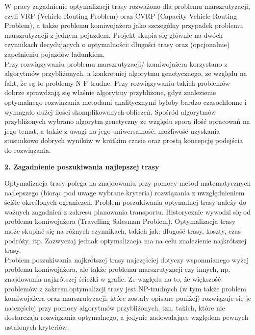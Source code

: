 \documentclass[a4paper, twoside, 12pt, justified]{article}
\begin{document}
	W pracy zagadnienie optymalizacji trasy rozważono dla problemu marszrutyzacji, czyli VRP (Vehicle Routing Problem) oraz CVRP (Capacity Vehicle Routing Problem), a także problemu komiwojażera jako szczególny przypadek problemu marszrutyzacji z jednym pojazdem. Projekt skupia się głównie na dwóch czynnikach decydujących o optymalności: długości trasy oraz (opcjonalnie) zapełnieniu pojazdów ładunkiem. \\
	Przy rozwiązywaniu problemu marszrutyzacji/ komiwojażera korzystano z algorytmów przybliżonych, a konkretniej algorytmu genetycznego, ze względu na fakt, że są to problemy N-P trudne. Przy rozwiązywaniu takich problemów dobrze sprawdzają się właśnie algorytmy przybliżone, gdyż znalezienie optymalnego rozwiązania metodami analitycznymi byłoby bardzo czasochłonne i wymagało dużej ilości skomplikowanych obliczeń. Spośród algorytmów przybliżonych wybrano algorytm genetyczny ze względu sporą ilość opracowań na jego temat, a także z uwagi na jego uniwersalność, możliwość uzyskania stosunkowo dobrych wyników w krótkim czasie oraz prostą koncepcję podejścia do rozwiązania. \\
	
	
	
	\newpage
	\begin{flushleft}
		\begin{LARGE}
			\textbf{2. Zagadnienie poszukiwania najlepszej trasy}
		\end{LARGE}
	\end{flushleft}

	\vspace{5mm} %
	
	Optymalizacja trasy polega na znajdowaniu przy pomocy metod matematycznych najlepszego (biorąc pod uwage wybrane kryteria) rozwiązania z uwzględnieniem ściśle określonych ograniczeń. Problem poszukiwania optymalnej trasy należy do ważnych zagadnień z zakresu planowania transportu. Historycznie wywodzi się od problemu komiwojażera (Travelling Salesman Problem). Optymalizacja trasy może skupiać się na różnych czynnikach, takich jak: długość trasy, koszty, czas podróży, itp. Zazwyczaj jednak optymalizacja ma na celu znalezienie najkrótszej trasy.\\
	Problem poszukiwania najkrótszej trasy najczęściej dotyczy wspomnianego wyżej problemu komiwojażera, ale także problemu marszrutyzacji czy innych, np. znajdowania najkrótszej ścieżki w grafie. Ze względu na to, że większość problemów z zakresu optymalizcji trasy jest NP-trudnych (w tym także problem komiwojażera oraz marszrutyzacji, które zostały opisane poniżej) rozwiązuje się je najczęściej przy pomocy algorytmów przybliżonych, tzn. takich, które nie dostarczają rozwiązania optymalnego, a jedynie zadowalające względem pewnych ustalonych kryteriów. 
	
\end{document}
